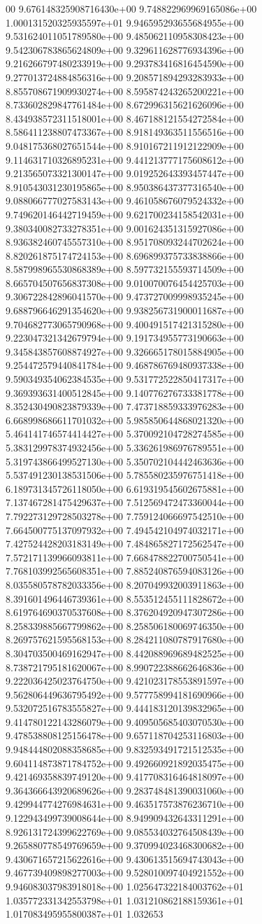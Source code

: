 00	9.676148325908716430e+00	9.748822969969165086e+00	1.000131520325935597e+01	9.946595293655684955e+00	9.531624011051789580e+00	9.485062110958308423e+00	9.542306783865624809e+00	9.329611628776934396e+00	9.216266797480233919e+00	9.293783416816454590e+00	9.277013724884856316e+00	9.208571894293283933e+00	8.855708671909930274e+00	8.595874243265200221e+00	8.733602829847761484e+00	8.672996315621626096e+00	8.434938572311518001e+00	8.467188121554272584e+00	8.586411238807473367e+00	8.918149363511556516e+00	9.048175368027651544e+00	8.910167211912122909e+00	9.114631710326895231e+00	9.441213777175608612e+00	9.213565073321300147e+00	9.019252643393457447e+00	8.910543031230195865e+00	8.950386437377316540e+00	9.088066777027583143e+00	9.461058676079524332e+00	9.749620146442719459e+00	9.621700234158542031e+00	9.380340082733278351e+00	9.001624351315927086e+00	8.936382460745557310e+00	8.951708093244702624e+00	8.820261875174724153e+00	8.696899375733838866e+00	8.587998965530868389e+00	8.597732155593714509e+00	8.665704507656837308e+00	9.010070076454425703e+00	9.306722842896041570e+00	9.473727009998935245e+00	9.688796646291354620e+00	9.938256731900011687e+00	9.704682773065790968e+00	9.400491517421315280e+00	9.223047321342679794e+00	9.191734955773190663e+00	9.345843857608874927e+00	9.326665178015884905e+00	9.254472579440841784e+00	9.468786769480937338e+00	9.590349354062384535e+00	9.531772522850417317e+00	9.369393631400512845e+00	9.140776276733381778e+00	8.352430490823879339e+00	7.473718859333976283e+00	6.668998686611701032e+00	5.985850644868021320e+00	5.464141746574414427e+00	5.370092104728274585e+00	5.383129978374932456e+00	5.336261986976789551e+00	5.319743866499527130e+00	5.350702104442463636e+00	5.537491230138531506e+00	5.785580235976751418e+00	6.189731345726118050e+00	6.619319545602675881e+00	7.137467281475429637e+00	7.512569472473360044e+00	7.792273129728503278e+00	7.759124066697542510e+00	7.664500775137097932e+00	7.494542104974032171e+00	7.427524428203183149e+00	7.484865827172562547e+00	7.572171139966093811e+00	7.668478822700750541e+00	7.768103992565608351e+00	7.885240876594083126e+00	8.035580578782033356e+00	8.207049932003911863e+00	8.391601496446739361e+00	8.553512455111828672e+00	8.619764690370537608e+00	8.376204920947307286e+00	8.258339885667799862e+00	8.258506180069746350e+00	8.269757621595568153e+00	8.284211080787917680e+00	8.304703500469162947e+00	8.442088969689482525e+00	8.738721795181620067e+00	8.990722388662646836e+00	9.222036425023764750e+00	9.421023178553891597e+00	9.562806449636795492e+00	9.577758994181690966e+00	9.532072516783555827e+00	9.444183120139832965e+00	9.414780122143286079e+00	9.409505685403070530e+00	9.478538808125156478e+00	9.657118704253116803e+00	9.948444802088358685e+00	9.832593491721512535e+00	9.604114873871784752e+00	9.492660921892035475e+00	9.421469358839749120e+00	9.417708316464818097e+00	9.364366643920689626e+00	9.283748481390031060e+00	9.429944774276984631e+00	9.463517573876236710e+00	9.122943499739008644e+00	8.949909432643311291e+00	8.926131724399622769e+00	9.085534032764508439e+00	9.265880778549769659e+00	9.370994023468300682e+00	9.430671657215622616e+00	9.430613515694743043e+00	9.467739409898277003e+00	9.528010097404921552e+00	9.946083037983918018e+00	1.025647322184003762e+01	1.035772331342553798e+01	1.031210862188159361e+01	1.017083495955800387e+01	1.032653